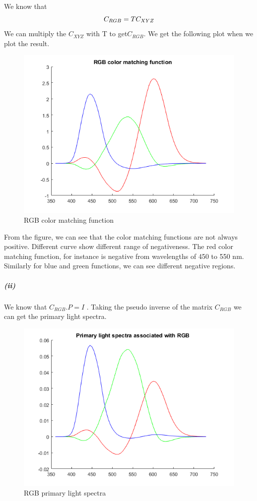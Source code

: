 \documentclass[12pt,letterpaper]{article}
\begin{document}
We know that
\begin{equation}
\textbf{$ C_{RGB} = T C_{XYZ}$}
\end{equation}  
We can multiply the $C_{XYZ}$ with T to get$ C_{RGB}$. We get the following plot when we plot the result.
\begin{figure}[htbp]
	\includegraphics{rgb.png}
	\caption{RGB color matching function}
\end{figure}

From the figure, we can see that the color matching functions are not always positive. Different curve show different range of negativeness. The red color matching function, for instance is negative from wavelengths of 450 to 550 nm. Similarly for blue and green functions, we can see different negative regions. 

\subparagraph*{(ii)}
We know that $ C_{RGB}. P = I$ . Taking the pseudo inverse of the matrix $C_{RGB}$ we can get the primary light spectra. 
\begin{figure}[htbp]
	\includegraphics{rgbinv.png}
	\caption{RGB primary light spectra}
\end{figure}
\end{document}
